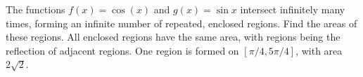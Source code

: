 {The functions $f(x) = \cos (x)$ and $g(x) = \sin x$ intersect infinitely many times, forming an infinite number of repeated, enclosed regions. Find the areas of these regions.}
{All enclosed regions have the same area, with regions being the reflection of adjacent regions. One region is formed on $[\pi/4,5\pi/4]$, with area  $2\sqrt{2}$.}
